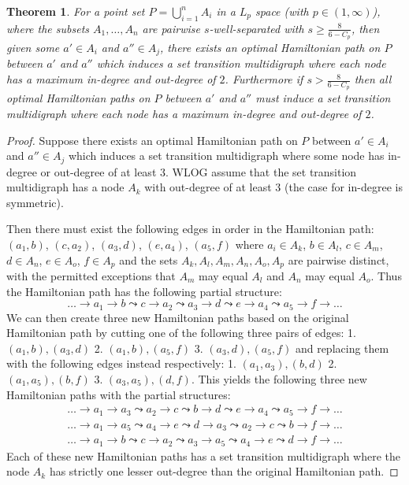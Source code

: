 \documentclass{article}
\newtheorem{thm}{Theorem}[section]
\theoremstyle{definition}
\begin{document}
\begin{thm}
    For a point set $P = \bigcup_{i=1}^n A_i$ in a $L_p$ space (with $p \in (1,\infty)$), where the subsets $A_1, \ldots, A_n$ are pairwise $s$-well-separated with $s \geq \frac{8}{6-C_p}$, then given some $a' \in A_i$ and $a'' \in A_j$, there exists an optimal Hamiltonian path on $P$ between $a'$ and $a''$ which induces a set transition multidigraph where each node has a maximum in-degree and out-degree of $2$.
    Furthermore if $s > \frac{8}{6-C_p}$ then all optimal Hamiltonian paths on $P$ between $a'$ and $a''$ must induce a set transition multidigraph where each node has a maximum in-degree and out-degree of $2$.
\end{thm}
\begin{proof}
    Suppose there exists an optimal Hamiltonian path on $P$ between $a' \in A_i$ and $a'' \in A_j$ which induces a set transition multidigraph where some node has in-degree or out-degree of at least $3$.
    WLOG assume that the set transition multidigraph has a node $A_k$ with out-degree of at least $3$ (the case for in-degree is symmetric).

    Then there must exist the following edges in order in the Hamiltonian path: $(a_1, b)$, $(c, a_2)$, $(a_3, d)$, $(e, a_4)$, $(a_5, f)$ where $a_i \in A_k$, $b \in A_l$, $c \in A_m$, $d \in A_n$, $e \in A_o$, $f \in A_p$ and the sets $A_k, A_l, A_m, A_n, A_o, A_p$ are pairwise distinct, with the permitted exceptions that $A_m$ may equal $A_l$ and $A_n$ may equal $A_o$.
    Thus the Hamiltonian path has the following partial structure:
    $$\dots \to a_1 \to b \leadsto c \to a_2 \leadsto a_3 \to d \leadsto e \to a_4 \leadsto a_5 \to f \to \dots$$
    We can then create three new Hamiltonian paths based on the original Hamiltonian path by cutting one of the following three pairs of edges: 1. $(a_1, b), (a_3, d)$ 2. $(a_1, b), (a_5, f)$ 3. $(a_3, d), (a_5, f)$ and replacing them with the following edges instead respectively: 1. $(a_1, a_3), (b, d)$ 2. $(a_1, a_5), (b, f)$ 3. $(a_3, a_5), (d, f)$.
    This yields the following three new Hamiltonian paths with the partial structures:
    \begin{eqnarray}
        \dots \to a_1 \to a_3 \leadsto a_2 \to c \leadsto b \to d \leadsto e \to a_4 \leadsto a_5 \to f \to \dots \\
        \dots \to a_1 \to a_5 \leadsto a_4 \to e \leadsto d \to a_3 \leadsto a_2 \to c \leadsto b \to f \to \dots \\
        \dots \to a_1 \to b \leadsto c \to a_2 \leadsto a_3 \to a_5 \leadsto a_4 \to e \leadsto d \to f \to \dots
    \end{eqnarray}
    Each of these new Hamiltonian paths has a set transition multidigraph where the node $A_k$ has strictly one lesser out-degree than the original Hamiltonian path.


\end{proof}
\end{document}
